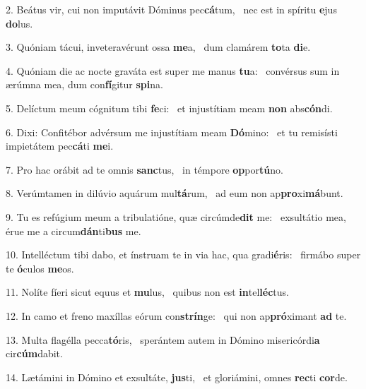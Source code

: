 2. Beátus vir, cui non imputávit Dóminus pec\textbf{cá}tum, \ast\  nec est in spíritu \textbf{e}jus \textbf{do}lus.\

3. Quóniam tácui, inveteravérunt ossa \textbf{me}a, \ast\  dum clamárem \textbf{to}ta \textbf{di}e.\

4. Quóniam die ac nocte graváta est super me manus \textbf{tu}a: \ast\  convérsus sum in ærúmna mea, dum con\textbf{fí}gitur \textbf{spi}na.\

5. Delíctum meum cógnitum tibi \textbf{fe}ci: \ast\  et injustítiam meam \textbf{non} abs\textbf{cón}di.\

6. Dixi: Confitébor advérsum me injustítiam meam \textbf{Dó}mino: \ast\  et tu remisísti impietátem pec\textbf{cá}ti \textbf{me}i.\

7. Pro hac orábit ad te omnis \textbf{sanc}tus, \ast\  in témpore \textbf{op}por\textbf{tú}no.\

8. Verúmtamen in dilúvio aquárum mul\textbf{tá}rum, \ast\  ad eum non ap\textbf{pro}xi\textbf{má}bunt.\

9. Tu es refúgium meum a tribulatióne, quæ circúmde\textbf{dit} me: \ast\  exsultátio mea, érue me a circum\textbf{dán}ti\textbf{bus} me.\

10. Intelléctum tibi dabo, et ínstruam te in via hac, qua gradi\textbf{é}ris: \ast\  firmábo super te \textbf{ó}culos \textbf{me}os.\

11. Nolíte fíeri sicut equus et \textbf{mu}lus, \ast\  quibus non est \textbf{in}tel\textbf{léc}tus.\

12. In camo et freno maxíllas eórum con\textbf{strín}ge: \ast\  qui non ap\textbf{pró}ximant \textbf{ad} te.\

13. Multa flagélla pecca\textbf{tó}ris, \ast\  sperántem autem in Dómino misericórdi\textbf{a} cir\textbf{cúm}dabit.\

14. Lætámini in Dómino et exsultáte, \textbf{jus}ti, \ast\  et gloriámini, omnes \textbf{rec}ti \textbf{cor}de.\

